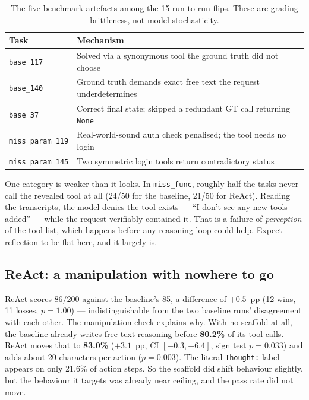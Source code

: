 \documentclass[a4paper, 12pt]{article}
\begin{document}
\begin{table}[t]
\centering\footnotesize
\caption{The five benchmark artefacts among the 15 run-to-run flips. These are
grading brittleness, not model stochasticity.}
\label{tab:confounders}
\begin{tabular}{@{}ll@{}}
\toprule
\textbf{Task} & \textbf{Mechanism} \\
\midrule
\texttt{base\_117}       & Solved via a synonymous tool the ground truth did not choose \\
\texttt{base\_140}       & Ground truth demands exact free text the request underdetermines \\
\texttt{base\_37}        & Correct final state; skipped a redundant GT call returning \texttt{None} \\
\texttt{miss\_param\_119}& Real-world-sound auth check penalised; the tool needs no login \\
\texttt{miss\_param\_145}& Two symmetric login tools return contradictory status \\
\bottomrule
\end{tabular}
\end{table}

One category is weaker than it looks. In \texttt{miss\_func}, roughly half the
tasks never call the revealed tool at all (24/50 for the baseline, 21/50 for
ReAct). Reading the transcripts, the model denies the tool exists --- ``I don't
see any new tools added'' --- while the request verifiably contained it. That is
a failure of \emph{perception} of the tool list, which happens before any
reasoning loop could help. Expect reflection to be flat here, and it largely is.

\subsection{ReAct: a manipulation with nowhere to go}

ReAct scores 86/200 against the baseline's 85, a difference of $+0.5$~pp
(12 wins, 11 losses, $p=1.00$) --- indistinguishable from the two baseline runs'
disagreement with each other. The manipulation check explains why. With no
scaffold at all, the baseline already writes free-text reasoning before
\textbf{80.2\%} of its tool calls. ReAct moves that to \textbf{83.0\%}
($+3.1$~pp, CI $[-0.3,+6.4]$, sign test $p=0.033$) and adds about 20 characters
per action ($p=0.003$). The literal \texttt{Thought:} label appears on only
21.6\% of action steps. So the scaffold did shift behaviour slightly, but the
behaviour it targets was already near ceiling, and the pass rate did not move.
\end{document}
